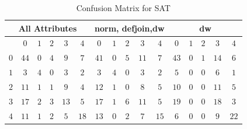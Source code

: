 \begin{table}[h]
	\center
	\begin{tabular}{|c|ccccc|ccccc|ccccc|}
		\hline\multicolumn{6}{|c|}{All Attributes} &\multicolumn{5}{|c|}{norm, defjoin,dw}&\multicolumn{5}{|c|}{dw}\\
		\hline &$0$&$1$&$2$&$3$&$4$&$0$&$1$&$2$&$3$&$4$&$0$&$1$&$2$&$3$&$4$\\
		\hline $0$&$44$&$0$&$4$&$9$&$7$&$41$&$0$&$5$&$11$&$7$&$43$&$0$&$1$&$14$&$6$\\
					 $1$&$3$ &$4$&$0$&$3$&$2$&$3$&$4$&$0$&$3$&$2$&$5$&$0$&$0$&$6$&$1$\\
           $2$&$11$&$1$&$1$&$9$&$4$&$12$&$1$&$0$&$8$&$5$&$10$&$0$&$0$&$11$&$5$\\
				   $3$&$17$&$2$&$3$&$13$&$5$&$17$&$1$&$6$&$11$&$5$&$19$&$0$&$0$&$18$&$3$\\
				   $4$&$11$&$1$&$2$&$5$&$18$&$13$&$0$&$2$&$7$&$15$&$6$&$0$&$0$&$9$&$22$\\
		\hline
	\end{tabular}
	\caption{Confusion Matrix for SAT}
	\label{tbl:satCM}
\end{table}
